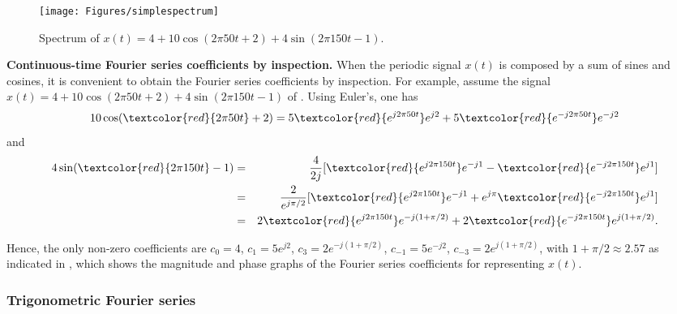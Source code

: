 \begin{figure}[!htb]
        \centering
                \texttt{[image: Figures/simplespectrum]}              
        \caption{Spectrum of $x(t)=4 + 10\cos(2 \pi 50 t + 2) + 4\sin(2 \pi 150 t - 1)$.\label{fig:simplespectrum}}
\end{figure}

\bExample \textbf{Continuous-time Fourier series coefficients by inspection.}
\label{ex:coefficients_by_inspection}
When the periodic signal $x(t)$ is composed by a sum of sines and cosines, it is convenient to obtain the Fourier series coefficients by inspection. For example, assume the signal $x(t)=4 + 10\cos(2 \pi 50 t + 2) + 4\sin(2 \pi 150 t - 1)$ of . Using Euler's, one has
\[
10\cos(\textcolor{red}{2 \pi 50 t} + 2)=5 \textcolor{red}{e^{j 2 \pi 50 t}} e^{j 2} + 5 \textcolor{red}{e^{-j 2 \pi 50 t}}  e^{-j 2}
\]
and
\begin{eqnarray*}
4\sin( \textcolor{red}{2 \pi 150 t} - 1) & = & \frac{4}{2j} [\textcolor{red}{ e^{j 2 \pi 150 t}} e^{-j 1} -  \textcolor{red}{e^{-j 2 \pi 150 t}}  e^{j 1}] \\
 & = & \frac{2}{e^{j \pi/2}} [\textcolor{red}{e^{j 2 \pi 150 t}} e^{-j 1} + e^{j \pi}  \textcolor{red}{e^{-j 2 \pi 150 t}}  e^{j 1}] \\
 & = & 2\textcolor{red}{e^{j 2 \pi 150 t}} e^{-j (1+\pi/2)} + 2 \textcolor{red}{e^{-j 2 \pi 150 t}}  e^{j (1+\pi/2)}.
\end{eqnarray*}

Hence, the only non-zero coefficients are $c_0 = 4$, $c_1=5e^{j2}$, $c_3=2e^{-j(1+\pi/2)}$, $c_{-1}=5e^{-j2}$, $c_{-3}=2e^{j(1+\pi/2)}$, with $1+\pi/2 \approx 2.57$ as indicated in , which 
shows the magnitude and phase graphs of the Fourier series coefficients for representing $x(t)$. 
\eExample

\subsubsection{Trigonometric Fourier series}

